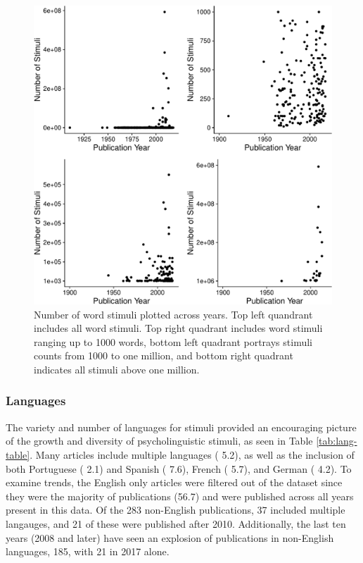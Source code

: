 \documentclass[english,man]{apa6}
\theoremstyle{definition}
\theoremstyle{definition}
\theoremstyle{definition}
\theoremstyle{remark}
\begin{document}
\begin{figure}
\centering
\includegraphics{LAB_files/figure-latex/word-fig-1.pdf}
\caption{\label{fig:word-fig}Number of word stimuli plotted across years.
Top left quandrant includes all word stimuli. Top right quadrant
includes word stimuli ranging up to 1000 words, bottom left quadrant
portrays stimuli counts from 1000 to one million, and bottom right
quadrant indicates all stimuli above one million.}
\end{figure}

\subsubsection{Languages}\label{languages}

The variety and number of languages for stimuli provided an encouraging
picture of the growth and diversity of psycholinguistic stimuli, as seen
in Table \ref{tab:lang-table}. Many articles include multiple languages
( 5.2), as well as the inclusion of both Portuguese ( 2.1) and Spanish (
7.6), French ( 5.7), and German ( 4.2). To examine trends, the English
only articles were filtered out of the dataset since they were the
majority of publications (56.7) and were published across all years
present in this data. Of the 283 non-English publications, 37 included
multiple langauges, and 21 of these were published after 2010.
Additionally, the last ten years (2008 and later) have seen an explosion
of publications in non-English languages, 185, with 21 in 2017 alone.
\end{document}
